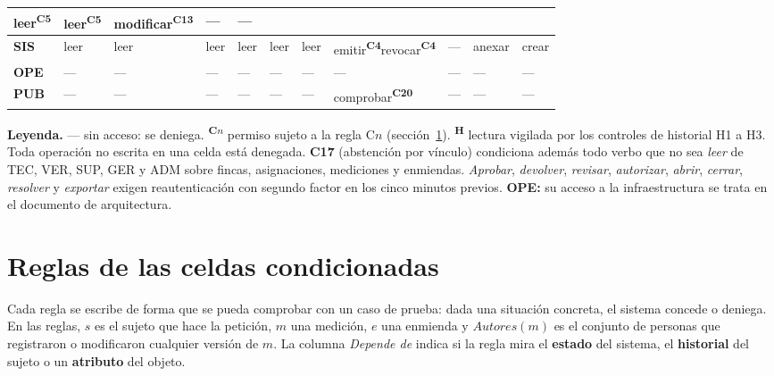 \documentclass[11pt,letterpaper]{article}
\newcommand{\cnd}[1]{\textsuperscript{\rmfamily\bfseries #1}}   %
\newcommand{\no}{---}                  %
\begin{document}
\begin{landscape}
{\begin{tabularx}{\linewidth}{@{}>{\bfseries}L{1.15cm}|Y|Y|Y|Y|Y|Y|Y|Y|Y|Y@{}}
leer\cnd{C5} &
leer\cnd{C5} &
modificar\cnd{C13} &
\no &
\no \\
\hline
SIS &
leer &
leer &
leer &
leer &
leer &
leer &
emitir\cnd{C4}\newline revocar\cnd{C4} &
\no &
anexar &
crear \\
\hline
OPE & \no & \no & \no & \no & \no & \no & \no & \no & \no & \no \\
\hline
PUB & \no & \no & \no & \no & \no & \no & comprobar\cnd{C20} & \no & \no & \no \\
\end{tabularx}
}

\vspace{0.2em}
{\footnotesize\rmfamily
\textbf{Leyenda.}\quad
--- sin acceso: se deniega.\quad
\cnd{C$n$} permiso sujeto a la regla C$n$ (sección~\ref{sec:reglas}).\quad
\cnd{H} lectura vigilada por los controles de historial H1 a H3.\quad
Toda operación no escrita en una celda está denegada.\quad
\textbf{C17} (abstención por vínculo) condiciona además todo verbo que no sea \emph{leer} de TEC, VER, SUP, GER y ADM
sobre fincas, asignaciones, mediciones y enmiendas.\quad
\emph{Aprobar}, \emph{devolver}, \emph{revisar}, \emph{autorizar}, \emph{abrir}, \emph{cerrar}, \emph{resolver} y \emph{exportar}
exigen reautenticación con segundo factor en los cinco minutos previos.\quad
\textbf{OPE:} su acceso a la infraestructura se trata en el documento de arquitectura.}
\end{landscape}

\section{Reglas de las celdas condicionadas}
\label{sec:reglas}

Cada regla se escribe de forma que se pueda comprobar con un caso de prueba: dada una situación
concreta, el sistema concede o deniega. En las reglas, $s$ es el sujeto que hace la petición, $m$ una
medición, $e$ una enmienda y $\mathit{Autores}(m)$ es el conjunto de personas que registraron o
modificaron cualquier versión de $m$. La columna \emph{Depende de} indica si la regla mira el
\textbf{estado} del sistema, el \textbf{historial} del sujeto o un \textbf{atributo} del objeto.
\end{document}
